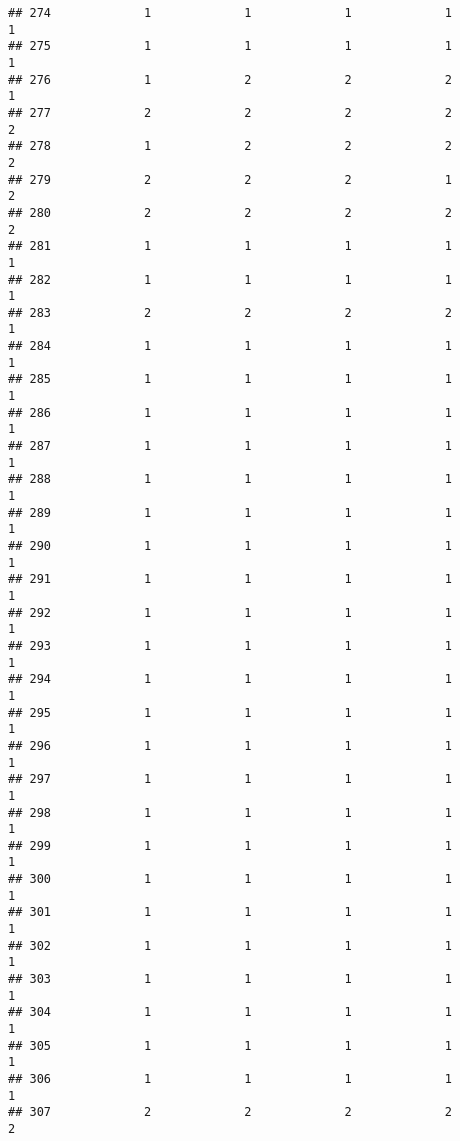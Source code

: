 \documentclass[
]{article}
\begin{document}
\begin{verbatim}
## 274             1             1             1             1             1
## 275             1             1             1             1             1
## 276             1             2             2             2             1
## 277             2             2             2             2             2
## 278             1             2             2             2             2
## 279             2             2             2             1             2
## 280             2             2             2             2             2
## 281             1             1             1             1             1
## 282             1             1             1             1             1
## 283             2             2             2             2             1
## 284             1             1             1             1             1
## 285             1             1             1             1             1
## 286             1             1             1             1             1
## 287             1             1             1             1             1
## 288             1             1             1             1             1
## 289             1             1             1             1             1
## 290             1             1             1             1             1
## 291             1             1             1             1             1
## 292             1             1             1             1             1
## 293             1             1             1             1             1
## 294             1             1             1             1             1
## 295             1             1             1             1             1
## 296             1             1             1             1             1
## 297             1             1             1             1             1
## 298             1             1             1             1             1
## 299             1             1             1             1             1
## 300             1             1             1             1             1
## 301             1             1             1             1             1
## 302             1             1             1             1             1
## 303             1             1             1             1             1
## 304             1             1             1             1             1
## 305             1             1             1             1             1
## 306             1             1             1             1             1
## 307             2             2             2             2             2

\end{verbatim}
\end{document}
